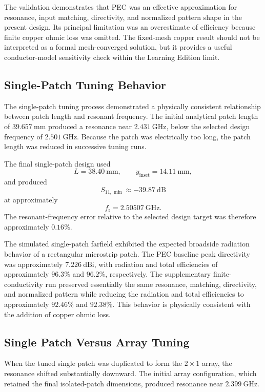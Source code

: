 The validation demonstrates that PEC was an effective approximation for resonance, input matching,
directivity, and normalized pattern shape in the present design. Its principal limitation was an
overestimate of efficiency because finite copper ohmic loss was omitted. The fixed-mesh copper result
should not be interpreted as a formal mesh-converged solution, but it provides a useful conductor-model
sensitivity check within the Learning Edition limit.

\subsection{Single-Patch Tuning Behavior}

The single-patch tuning process demonstrated a physically consistent relationship between patch length
and resonant frequency. The initial analytical patch length of \(39.657~\mathrm{mm}\) produced a
resonance near \(2.431~\mathrm{GHz}\), below the selected design frequency of
\(2.501~\mathrm{GHz}\). Because the patch was electrically too long, the patch length was reduced in
successive tuning runs.

The final single-patch design used
\[
L=38.40~\mathrm{mm},
\qquad
y_{\mathrm{inset}}=14.11~\mathrm{mm},
\]
and produced
\[
S_{11,\min}\approx -39.87~\mathrm{dB}
\]
at approximately
\[
f_{\mathrm{r}}=2.50507~\mathrm{GHz}.
\]
The resonant-frequency error relative to the selected design target was therefore approximately \(0.16\%\).

The simulated single-patch farfield exhibited the expected broadside radiation behavior of a
rectangular microstrip patch. The PEC baseline peak directivity was approximately
\(7.226~\mathrm{dBi}\), with radiation and total efficiencies of approximately \(96.3\%\)
and \(96.2\%\), respectively. The supplementary finite-conductivity run preserved essentially the
same resonance, matching, directivity, and normalized pattern while reducing the radiation and total
efficiencies to approximately \(92.46\%\) and \(92.38\%\). This behavior is physically consistent
with the addition of copper ohmic loss.

\subsection{Single Patch Versus Array Tuning}

When the tuned single patch was duplicated to form the \(2\times1\) array, the resonance shifted
substantially downward. The initial array configuration, which retained the final isolated-patch
dimensions, produced resonance near \(2.399~\mathrm{GHz}\).

